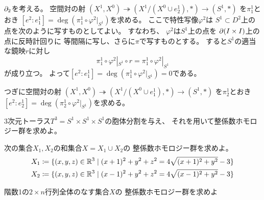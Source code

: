 \documentclass[report]{jlreq}
\begin{document}
\begin{answer}
    $\partial_2$を考える。
    空間対の射
    $(X^1, X^0) \twoheadrightarrow (X^1 / (X^0 \cup e^1_2), *) \to (S^1, *)$
    を$\pi^1_1$とおき
    $[e^2 : e^1_1] = \deg (\pi^1_1 \circ \varphi^2|_{S^1})$を求める。
    ここで特性写像$\varphi^2$は
    $S^1 \subset D^2$上の点を次のように写すものとしてよい。
    すなわち、
    $\varphi^2$は$S^1$上の点を
    $\partial (I \times I)$上の点に反時計回りに
    等間隔に写し、さらに$\pi$で写すものとする。
    すると$S^1$の適当な鏡映$r$に対し
    \begin{equation}
        \pi^1_1 \circ \varphi^2|_{S^1} \circ r
            = \pi^1_1 \circ \varphi^2|_{S^1}
    \end{equation}
    が成り立つ。
    よって$[e^2 : e^1_1] = \deg (\pi^1_1 \circ \varphi^2|_{S^1}) = 0$である。

    つぎに空間対の射
    $(X^1, X^0) \twoheadrightarrow (X^1 / (X^0 \cup e^1_1), *) \to (S^1, *)$
    を$\pi^1_2$とおき
    $[e^2 : e^1_2] = \deg (\pi^1_2 \circ \varphi^2|_{S^1})$を求める。
\end{answer}

\begin{problem}
    3次元トーラス$T^3 = S^1 \times S^1 \times S^1$の胞体分割を与え、
    それを用いて整係数ホモロジー群を求めよ。
\end{problem}

\begin{answer}
    \TODO{}
\end{answer}

\begin{problem}
    次の集合$X_1, X_2$の和集合$X = X_1 \cup X_2$の
    整係数ホモロジー群を求めよ。
    \begin{alignat}{1}
        X_1 &\coloneqq \{
            (x, y, z) \in \mathbb{R}^3 \mid
            (x + 1)^2 + y^2 + z^2 = 4 \sqrt{(x + 1)^2 + y^2} - 3
        \} \\
        X_2 &\coloneqq \{
            (x, y, z) \in \mathbb{R}^3 \mid
            (x - 1)^2 + y^2 + z^2 = 4 \sqrt{(x - 1)^2 + y^2} - 3
        \}
    \end{alignat}
\end{problem}

\begin{answer}
    \TODO{}
\end{answer}

\begin{problem}
    階数1の$2 \times n$行列全体のなす集合$X$の
    整係数ホモロジー群を求めよ
\end{problem}

\begin{answer}
    \TODO{}
\end{answer}
\end{document}
